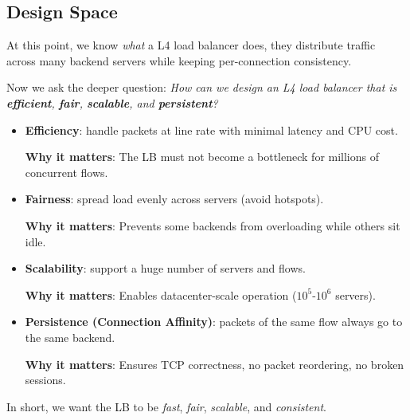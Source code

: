 \subsection{Design Space}\label{sec:design-space}

At this point, we know \emph{what} a L4 load balancer does, they distribute traffic across many backend servers while keeping per-connection consistency.

\highspace
Now we ask the deeper question: \emph{How can we design an L4 load balancer that is \textbf{efficient}, \textbf{fair}, \textbf{scalable}, and \textbf{persistent}?}
\begin{itemize}
    \item \textbf{Efficiency}: handle packets at line rate with minimal latency and CPU cost.

    \textcolor{Green3}{ \textbf{Why it matters}}: The LB must not become a bottleneck for millions of concurrent flows.


    \item \textbf{Fairness}: spread load evenly across servers (avoid hotspots).

    \textcolor{Green3}{ \textbf{Why it matters}}: Prevents some backends from overloading while others sit idle.
    
    
    \item \textbf{Scalability}: support a huge number of servers and flows.

    \textcolor{Green3}{ \textbf{Why it matters}}: Enables datacenter-scale operation ($10^5$-$10^6$ servers).
    
    
    \item \textbf{Persistence (Connection Affinity)}: packets of the same flow always go to the same backend.

    \textcolor{Green3}{ \textbf{Why it matters}}: Ensures TCP correctness, no packet reordering, no broken sessions.
\end{itemize}
In short, we want the LB to be \emph{fast}, \emph{fair}, \emph{scalable}, and \emph{consistent}.

